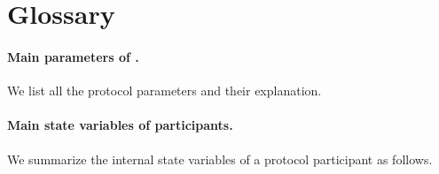 \section{Glossary}
\label{sec:glossary}

\paragraph{Main parameters of \chainKingConsensus.}
%
We list all the protocol parameters and their explanation.



\paragraph{Main state variables of \chainKingConsensus participants.}
%
We summarize the internal state variables of a protocol participant as follows.


